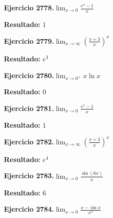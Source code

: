 \documentclass[10pt,a4paper]{article}
\begin{document}
\newpage
\begin{ejbox}
\textbf{Ejercicio 2778.}\quad $\lim_{x\to 0} \frac{e^x-1}{x}$
\end{ejbox}

\begin{solbox}
\textbf{Resultado:} \(\displaystyle 1\)
\end{solbox}

\begin{ejbox}
\textbf{Ejercicio 2779.}\quad $\lim_{x\to \infty} \left(\frac{x+3}{x}\right)^{x}$
\end{ejbox}

\begin{solbox}
\textbf{Resultado:} \(\displaystyle e^{3}\)
\end{solbox}

\begin{ejbox}
\textbf{Ejercicio 2780.}\quad $\lim_{x\to 0^+} x\ln x$
\end{ejbox}

\begin{solbox}
\textbf{Resultado:} \(\displaystyle 0\)
\end{solbox}

\newpage
\begin{ejbox}
\textbf{Ejercicio 2781.}\quad $\lim_{x\to 0} \frac{e^x-1}{x}$
\end{ejbox}

\begin{solbox}
\textbf{Resultado:} \(\displaystyle 1\)
\end{solbox}

\begin{ejbox}
\textbf{Ejercicio 2782.}\quad $\lim_{x\to \infty} \left(\frac{x+4}{x}\right)^{x}$
\end{ejbox}

\begin{solbox}
\textbf{Resultado:} \(\displaystyle e^{4}\)
\end{solbox}

\begin{ejbox}
\textbf{Ejercicio 2783.}\quad $\lim_{x\to 0} \frac{\sin(6x)}{x}$
\end{ejbox}

\begin{solbox}
\textbf{Resultado:} \(\displaystyle 6\)
\end{solbox}

\newpage
\begin{ejbox}
\textbf{Ejercicio 2784.}\quad $\lim_{x\to 0} \frac{x-\sin x}{x^3}$
\end{ejbox}
\end{document}
